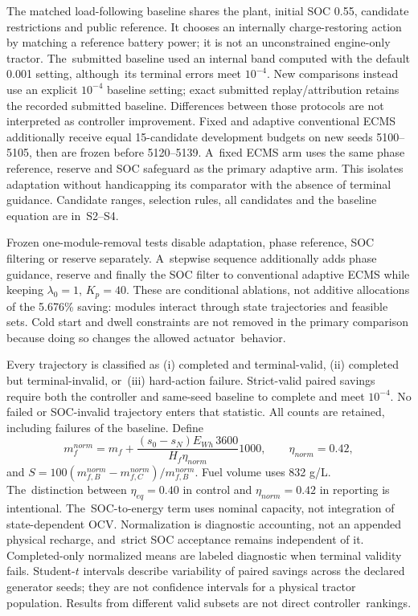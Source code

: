 \documentclass[energies,article,submit,moreauthors]{Definitions/mdpi}
\begin{document}
The matched load-following baseline shares the plant, initial SOC 0.55, candidate restrictions and public reference. It chooses an internally charge-restoring action by matching a reference battery power; it is not an unconstrained engine-only tractor. The~submitted baseline used an internal band computed with the default  0.001 setting, although~its terminal errors meet $10^{-4}$. New comparisons instead use an explicit $10^{-4}$ baseline setting; exact submitted replay/attribution retains the recorded submitted baseline. Differences between those protocols are not interpreted as controller improvement. Fixed and adaptive conventional ECMS additionally receive equal 15-candidate development budgets on new seeds 5100--5105, then are frozen before 5120--5139. A~fixed ECMS arm uses the same phase reference, reserve and SOC safeguard as the primary adaptive arm. This isolates adaptation without handicapping its comparator with the absence of terminal guidance. Candidate ranges, selection rules, all candidates and the baseline equation are in~S2--S4.

Frozen one-module-removal tests disable adaptation, phase reference, SOC filtering or reserve separately. A~stepwise sequence additionally adds phase guidance, reserve and finally the SOC filter to conventional adaptive ECMS while keeping $\lambda_0=1$, $K_p=40$. These are conditional ablations, not additive allocations of the 5.676\% saving: modules interact through state trajectories and feasible sets. Cold start and dwell constraints are not removed in the primary comparison because doing so changes the allowed actuator~behavior.

Every trajectory is classified as (i) completed and terminal-valid, (ii) completed but terminal-invalid, or~(iii) hard-action failure. Strict-valid paired savings require both the controller and same-seed baseline to complete and meet $10^{-4}$. No failed or SOC-invalid trajectory enters that statistic. All counts are retained, including failures of the baseline. Define
\begin{equation}
 m_f^{norm}=m_f+\frac{(s_0-s_N)E_{Wh}\,3600}{H_f\eta_{norm}}1000,
 \qquad \eta_{norm}=0.42,
\end{equation}
and $S=100(m_{f,B}^{norm}-m_{f,C}^{norm})/m_{f,B}^{norm}$. Fuel volume uses 832 g/L. The~distinction between $\eta_{eq}=0.40$ in control and $\eta_{norm}=0.42$ in reporting is intentional. The~SOC-to-energy term uses nominal capacity, not integration of state-dependent OCV. Normalization is diagnostic accounting, not an appended physical recharge, and~strict SOC acceptance remains independent of it. Completed-only normalized means are labeled diagnostic when terminal validity fails. Student-$t$ intervals describe variability of paired savings across the declared generator seeds; they are not confidence intervals for a physical tractor population. Results from different valid subsets are not direct controller~rankings.
\end{document}
